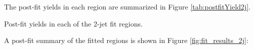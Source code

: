 
The post-fit yields in each region are summarized in Figure \ref{tab:postfitYield2j}.

\begin{table}[H]
\begin{adjustwidth}{-3em}{-3em}

\label{tab:postfitYield2j}
\caption{Post-fit yields in each of the 2-jet fit regions.}                                                         
\end{adjustwidth}
\end{table}


A post-fit summary of the fitted regions is shown in Figure \ref{fig:fit_results_2j}: 

